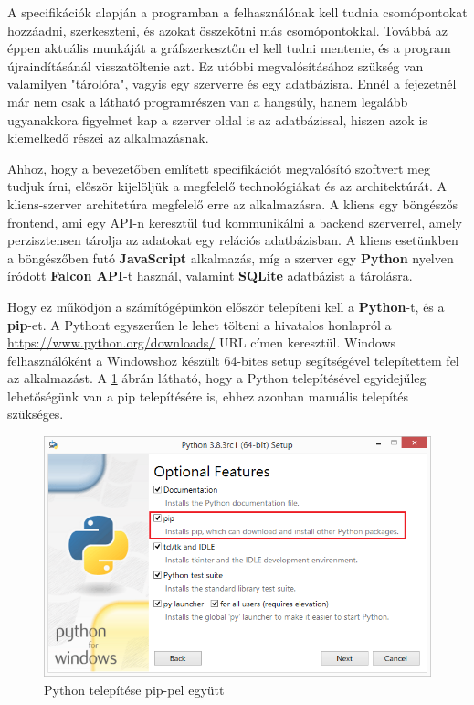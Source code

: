 

A specifikációk alapján a programban a felhasználónak kell tudnia csomópontokat hozzáadni, szerkeszteni, és azokat összekötni más csomópontokkal. Továbbá az éppen aktuális munkáját a gráfszerkesztőn el kell tudni mentenie, és a program újraindításánál visszatöltenie azt. Ez utóbbi megvalósításához szükség van valamilyen "tárolóra", vagyis egy szerverre és egy adatbázisra. Ennél a fejezetnél már nem csak a látható programrészen van a hangsúly, hanem legalább ugyanakkora figyelmet kap a szerver oldal is az adatbázissal, hiszen azok is kiemelkedő részei az alkalmazásnak.


Ahhoz, hogy a bevezetőben említett specifikációt megvalósító szoftvert meg tudjuk írni, először kijelöljük a megfelelő technológiákat és az architektúrát. A kliens-szerver architetúra megfelelő erre az alkalmazásra. A kliens egy böngészős frontend, ami egy API-n keresztül tud kommunikálni a backend szerverrel, amely perzisztensen tárolja az adatokat egy relációs adatbázisban. A kliens esetünkben a böngészőben futó \textbf{JavaScript} alkalmazás, míg a szerver egy \textbf{Python} nyelven íródott \textbf{Falcon API}-t használ, valamint \textbf{SQLite} adatbázist a tárolásra.
 
Hogy ez működjön a számítógépünkön először telepíteni kell a \textbf{Python}-t, és a \textbf{pip}-et. A Pythont egyszerűen le lehet tölteni a hivatalos honlapról a \url{https://www.python.org/downloads/} URL címen keresztül. Windows felhasználóként a Windowshoz készült 64-bites setup segítségével telepítettem fel az alkalmazást. A \ref{fig:pyt1} ábrán látható, hogy a Python telepítésével egyidejűleg lehetőségünk van a pip telepítésére is, ehhez azonban manuális telepítés szükséges.

\begin{figure}[h]
\centering
\includegraphics[scale=0.7]{images/python1.png}
\caption{Python telepítése pip-pel együtt}
\label{fig:pyt1}
\end{figure}

